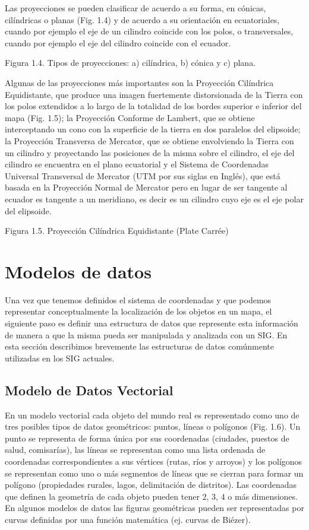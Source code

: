 
Las proyecciones se pueden clasificar de acuerdo a su forma, en cónicas, cilíndricas o planas (Fig. 1.4) y de acuerdo a su orientación en ecuatoriales, cuando por ejemplo el eje de un cilindro coincide con los polos, o transversales, cuando por ejemplo el eje del cilindro coincide con el ecuador.

Figura 1.4. Tipos de proyecciones: a) cilíndrica, b) cónica y c) plana.

Algunas de las proyecciones más importantes son la Proyección Cilíndrica Equidistante, que produce una imagen fuertemente distorsionada de la Tierra con los polos extendidos a lo largo de la totalidad de los bordes superior e inferior del mapa (Fig. 1.5); la Proyección Conforme de Lambert, que se obtiene interceptando un cono con la superficie de la tierra en dos paralelos del elipsoide; la Proyección Transversa de Mercator, que se obtiene envolviendo la Tierra con un cilindro y proyectando las posiciones de la misma sobre el cilindro, el eje del cilindro se encuentra en el plano ecuatorial y el Sistema de Coordenadas Universal Transversal de Mercator (UTM por sus siglas en Inglés), que está basada en la Proyección Normal de Mercator pero en lugar de ser tangente al ecuador es tangente a un meridiano, es decir es un cilindro cuyo eje es el eje polar del elipsoide.

Figura 1.5. Proyección Cilíndrica Equidistante (Plate Carrée)

\section{Modelos de datos}

Una vez que tenemos definidos el sistema de coordenadas y que podemos representar conceptualmente la localización de los objetos en un mapa, el siguiente paso es definir una estructura de datos que represente esta información de manera a que la misma pueda ser manipulada y analizada con un SIG. En esta sección describimos brevemente las estructuras de datos comúnmente utilizadas en los SIG actuales.

\subsection{Modelo de Datos Vectorial}

En un modelo vectorial cada objeto del mundo real es representado como uno de tres posibles tipos de datos geométricos: puntos, líneas o polígonos (Fig. 1.6). Un punto se representa de forma única por sus coordenadas (ciudades, puestos de salud, comisarías), las líneas se representan como una lista ordenada de coordenadas correspondientes a sus vértices (rutas, ríos y arroyos) y los polígonos se representan como uno o más segmentos de líneas que se cierran para formar un polígono (propiedades rurales, lagos, delimitación de distritos). Las coordenadas que definen la geometría de cada objeto pueden tener 2, 3, 4 o más dimensiones. En algunos modelos de datos las figuras geométricas pueden ser representadas por curvas definidas por una función matemática (ej. curvas de Biézer).

